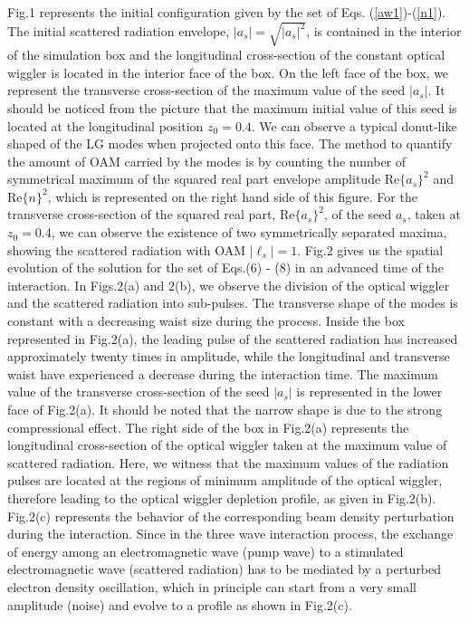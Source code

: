 \documentclass[aps,pra,preprint,showpacs,preprintnumbers,amsmath,amssymb]{revtex4-1}
\begin{document}
Fig.1 represents the initial configuration given by the set of  Eqs. (\ref{aw1})-(\ref{n1}). The initial scattered radiation  envelope, $|a_s| = \sqrt{|a_s|^2}$, is contained in the interior of the simulation box and the longitudinal cross-section of the constant optical wiggler is located in the interior face of the box. On the left face of the box, we represent the transverse cross-section of the maximum value of the seed $|a_s|$. It should be noticed from the picture that the maximum initial value of this seed is located at the longitudinal position $z_0 = 0.4$. We can observe a typical donut-like shaped of the LG modes when projected onto this face. The method to quantify the amount of OAM carried by the modes is by counting the number of symmetrical maximum of the squared real part envelope amplitude Re$\{a_s\}^2$ and Re$\{n\}^2$, which is represented on the right hand side of this figure. For the transverse cross-section of the squared real part, Re$\{a_s\}^2$, of the seed $a_{s}$, taken at  $z_0=0.4$, we can observe the existence of two symmetrically separated maxima, showing the scattered radiation with OAM $|\ell_s|=1$. Fig.2 gives us the spatial evolution of the solution for the set of Eqs.(6) - (8) in an advanced time of the interaction. In Figs.2(a) and 2(b), we observe the division of the optical wiggler and the scattered radiation into sub-pulses. The transverse shape of the modes is constant with a decreasing waist size during the process. Inside the box represented in Fig.2(a), the leading pulse of the scattered radiation has  increased approximately twenty times in amplitude, while the longitudinal and transverse waist have experienced a decrease during the interaction time. The maximum value of the transverse cross-section of the seed $|a_s|$ is represented in the lower face of Fig.2(a). It should be noted that the narrow shape is due to the strong compressional effect. The right side of the box in Fig.2(a) represents the longitudinal cross-section of the optical wiggler taken at the maximum value of scattered radiation. Here, we witness that the maximum values of the radiation pulses are located at the regions of minimum amplitude of the optical wiggler, therefore leading to the optical wiggler depletion profile, as given in Fig.2(b). Fig.2(c) represents the behavior of the corresponding beam density perturbation during the interaction.
Since in the three wave interaction process, the exchange of energy among an electromagnetic wave (pump wave) to a stimulated electromagnetic wave (scattered radiation) has to be mediated by a perturbed electron density oscillation, which in principle can start from a very small amplitude (noise) and evolve to a profile as shown in Fig.2(c).
\end{document}
